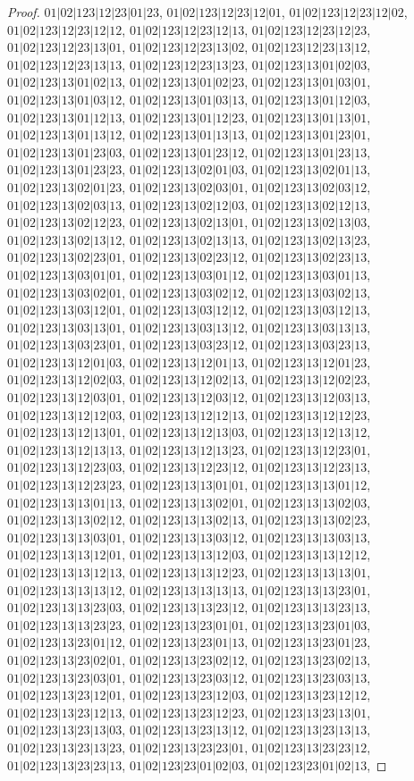 \documentclass[12pt]{article}
\theoremstyle{plain}
\theoremstyle{definition}
\theoremstyle{remark}
\begin{document}
\begin{proof}
$01|02|123|12|23|01|23$, $01|02|123|12|23|12|01$, $01|02|123|12|23|12|02$, $01|02|123|12|23|12|12$, $01|02|123|12|23|12|13$, $01|02|123|12|23|12|23$, $01|02|123|12|23|13|01$, $01|02|123|12|23|13|02$, $01|02|123|12|23|13|12$, $01|02|123|12|23|13|13$, $01|02|123|12|23|13|23$, $01|02|123|13|01|02|03$, $01|02|123|13|01|02|13$, $01|02|123|13|01|02|23$, $01|02|123|13|01|03|01$, $01|02|123|13|01|03|12$, $01|02|123|13|01|03|13$, $01|02|123|13|01|12|03$, $01|02|123|13|01|12|13$, $01|02|123|13|01|12|23$, $01|02|123|13|01|13|01$, $01|02|123|13|01|13|12$, $01|02|123|13|01|13|13$, $01|02|123|13|01|23|01$, $01|02|123|13|01|23|03$, $01|02|123|13|01|23|12$, $01|02|123|13|01|23|13$, $01|02|123|13|01|23|23$, $01|02|123|13|02|01|03$, $01|02|123|13|02|01|13$, $01|02|123|13|02|01|23$, $01|02|123|13|02|03|01$, $01|02|123|13|02|03|12$, $01|02|123|13|02|03|13$, $01|02|123|13|02|12|03$, $01|02|123|13|02|12|13$, $01|02|123|13|02|12|23$, $01|02|123|13|02|13|01$, $01|02|123|13|02|13|03$, $01|02|123|13|02|13|12$, $01|02|123|13|02|13|13$, $01|02|123|13|02|13|23$, $01|02|123|13|02|23|01$, $01|02|123|13|02|23|12$, $01|02|123|13|02|23|13$, $01|02|123|13|03|01|01$, $01|02|123|13|03|01|12$, $01|02|123|13|03|01|13$, $01|02|123|13|03|02|01$, $01|02|123|13|03|02|12$, $01|02|123|13|03|02|13$, $01|02|123|13|03|12|01$, $01|02|123|13|03|12|12$, $01|02|123|13|03|12|13$, $01|02|123|13|03|13|01$, $01|02|123|13|03|13|12$, $01|02|123|13|03|13|13$, $01|02|123|13|03|23|01$, $01|02|123|13|03|23|12$, $01|02|123|13|03|23|13$, $01|02|123|13|12|01|03$, $01|02|123|13|12|01|13$, $01|02|123|13|12|01|23$, $01|02|123|13|12|02|03$, $01|02|123|13|12|02|13$, $01|02|123|13|12|02|23$, $01|02|123|13|12|03|01$, $01|02|123|13|12|03|12$, $01|02|123|13|12|03|13$, $01|02|123|13|12|12|03$, $01|02|123|13|12|12|13$, $01|02|123|13|12|12|23$, $01|02|123|13|12|13|01$, $01|02|123|13|12|13|03$, $01|02|123|13|12|13|12$, $01|02|123|13|12|13|13$, $01|02|123|13|12|13|23$, $01|02|123|13|12|23|01$, $01|02|123|13|12|23|03$, $01|02|123|13|12|23|12$, $01|02|123|13|12|23|13$, $01|02|123|13|12|23|23$, $01|02|123|13|13|01|01$, $01|02|123|13|13|01|12$, $01|02|123|13|13|01|13$, $01|02|123|13|13|02|01$, $01|02|123|13|13|02|03$, $01|02|123|13|13|02|12$, $01|02|123|13|13|02|13$, $01|02|123|13|13|02|23$, $01|02|123|13|13|03|01$, $01|02|123|13|13|03|12$, $01|02|123|13|13|03|13$, $01|02|123|13|13|12|01$, $01|02|123|13|13|12|03$, $01|02|123|13|13|12|12$, $01|02|123|13|13|12|13$, $01|02|123|13|13|12|23$, $01|02|123|13|13|13|01$, $01|02|123|13|13|13|12$, $01|02|123|13|13|13|13$, $01|02|123|13|13|23|01$, $01|02|123|13|13|23|03$, $01|02|123|13|13|23|12$, $01|02|123|13|13|23|13$, $01|02|123|13|13|23|23$, $01|02|123|13|23|01|01$, $01|02|123|13|23|01|03$, $01|02|123|13|23|01|12$, $01|02|123|13|23|01|13$, $01|02|123|13|23|01|23$, $01|02|123|13|23|02|01$, $01|02|123|13|23|02|12$, $01|02|123|13|23|02|13$, $01|02|123|13|23|03|01$, $01|02|123|13|23|03|12$, $01|02|123|13|23|03|13$, $01|02|123|13|23|12|01$, $01|02|123|13|23|12|03$, $01|02|123|13|23|12|12$, $01|02|123|13|23|12|13$, $01|02|123|13|23|12|23$, $01|02|123|13|23|13|01$, $01|02|123|13|23|13|03$, $01|02|123|13|23|13|12$, $01|02|123|13|23|13|13$, $01|02|123|13|23|13|23$, $01|02|123|13|23|23|01$, $01|02|123|13|23|23|12$, $01|02|123|13|23|23|13$, $01|02|123|23|01|02|03$, $01|02|123|23|01|02|13$, 
\end{proof}
\end{document}
